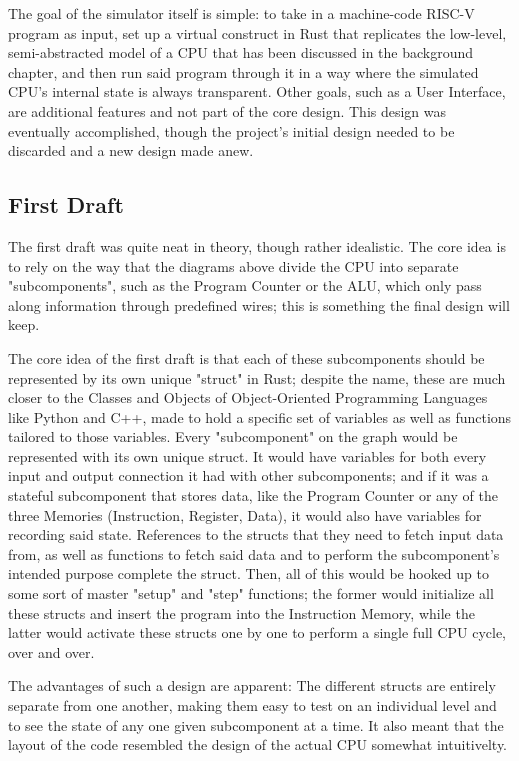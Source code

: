 \documentclass[12pt,twoside]{reedthesis}
\begin{document}
The goal of the simulator itself is simple: to take in a machine-code RISC-V program as input, set up a virtual construct in Rust that replicates the low-level, semi-abstracted model of a CPU that has been discussed in the background chapter, and then run said program through it in a way where the simulated CPU's internal state is always transparent. Other goals, such as a User Interface, are additional features and not part of the core design. This design was eventually accomplished, though the project's initial design needed to be discarded and a new design made anew. %

\subsection{First Draft}

The first draft was quite neat in theory, though rather idealistic. The core idea is to rely on the way that the diagrams above divide the CPU into separate "subcomponents", such as the Program Counter or the ALU, which only pass along information through predefined wires; this is something the final design will keep.

The core idea of the first draft is that each of these subcomponents should be represented by its own unique "struct" in Rust; despite the name, these are much closer to the Classes and Objects of Object-Oriented Programming Languages like Python and C++, made to hold a specific set of variables as well as functions tailored to those variables.
Every "subcomponent" on the graph would be represented with its own unique struct. It would have variables for both every input and output connection it had with other subcomponents; and if it was a stateful subcomponent that stores data, like the Program Counter or any of the three Memories (Instruction, Register, Data), it would also have variables for recording said state. References to the structs that they need to fetch input data from, as well as functions to fetch said data and to perform the subcomponent's intended purpose complete the struct.
Then, all of this would be hooked up to some sort of master "setup" and "step" functions; the former would initialize all these structs and insert the program into the Instruction Memory, while the latter would activate these structs one by one to perform a single full CPU cycle, over and over.

The advantages of such a design are apparent: The different structs are entirely separate from one another, making them easy to test on an individual level and to see the state of any one given subcomponent at a time. It also meant that the layout of the code resembled the design of the actual CPU somewhat intuitivelty.
\end{document}
